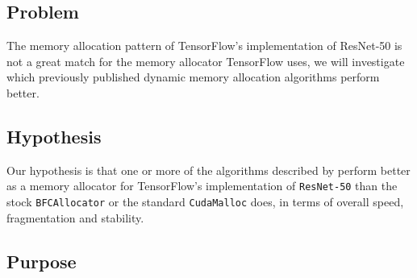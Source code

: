 \documentclass[12pt,twoside]{article}
\begin{document}
\subsection{Problem}
\label{sec:problem}



The memory allocation pattern of TensorFlow's implementation of ResNet-50 is not a great match for the memory allocator TensorFlow uses, we will investigate which previously published dynamic memory allocation algorithms perform better.



\subsection{Hypothesis}
\label{sec:hypothesis}


Our hypothesis is that one or more of the algorithms described by \citeauthor{Vinkler2015} \cite{Vinkler2015} perform better as a memory allocator for TensorFlow's implementation of \texttt{ResNet-50} than the stock \texttt{BFCAllocator} or the standard \texttt{CudaMalloc} does, in terms of overall speed, fragmentation and stability.


\subsection{Purpose}
\label{sec:purpose}

\end{document}
